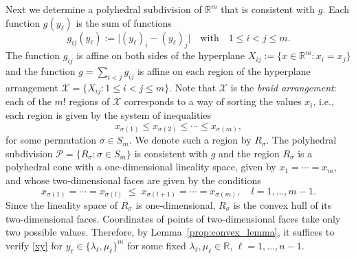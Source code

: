 \documentclass[11pt]{amsart}
\theoremstyle{definition}
\theoremstyle{remark}
\begin{document}
Next we determine a polyhedral subdivision of $\mathbb{R}^m$ that is consistent with $g$. Each function $g(y_{\ell})$ is the sum of functions 
\[
g_{ij}(y_{\ell}) := \bigl| (y_{\ell})_i - (y_{\ell})_j \bigr| \quad \text{with} \quad 1 \le i < j \le m. 
\]
The function $g_{ij}$ is affine on both sides of the hyperplane $X_{ij} := \{x \in \mathbb{R}^m : x_i = x_j\}$ and the function $g= \sum_{i<j} g_{ij}$ is affine on each region of the hyperplane arrangement $\mathcal{X}=\{X_{ij}:1\le i<j\le m\}$. Note that $\mathcal{X}$ is the \emph{braid arrangement}: each of the $m!$ regions of $\mathcal{X}$ corresponds to a way of sorting the values $x_i$, i.e., each region is given by the system of inequalities
\[
x_{\sigma(1)} \le x_{\sigma(2)} \le \cdots \le x_{\sigma(m)},
\]
for some permutation $\sigma \in S_m$. %
We denote such a region by $R_\sigma$. The polyhedral subdivision $\mathcal{P} = \{ R_\sigma : \sigma\in S_m\}$ is consistent with $g$ and the region $R_\sigma$ is a polyhedral cone with a one‑dimensional lineality space, given by $x_1 = \cdots = x_m$, and whose two‑dimensional faces are given by the conditions
\[
x_{\sigma(1)} = \cdots = x_{\sigma(l)}
\;\le\;
x_{\sigma(l+1)} = \cdots = x_{\sigma(m)},
\quad l = 1,\dots,m-1.
\]
Since the lineality space of $R_\sigma$ is one‑dimensional, $R_\sigma$ is the convex hull of its two‑dimensional faces. Coordinates of points of two-dimensional faces take only two possible values. Therefore, by Lemma~\eqref{prop:convex_lemma}, it suffices to verify \eqref{xy} for $y_{\ell}\in \{\lambda_\ell,\mu_\ell\}^m$ for some fixed $\lambda_\ell,\mu_\ell \in \mathbb{R}$, $\ell=1, \dots, n-1.$

\end{document}
